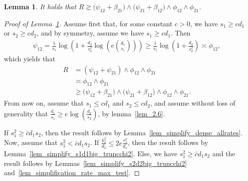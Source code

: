 \documentclass{article}
\newtheorem{lemma}{Lemma}
\theoremstyle{remark}
\begin{document}
\begin{lemma}\label{lem_simplified_rate_for_UB}
        It holds that $R \gtrsim \big(\psi_{12} + \beta_{21}\big) \land \big(\psi_{21} + \beta_{12}\big) \land \phi_{12} \land \phi_{21}$.
    \end{lemma}

    \begin{proof}[Proof of Lemma~\ref{lem_simplified_rate_for_UB}]
    Assume first that, for some constant $c>0$, we have $s_1 \geq c d_1$ or $s_2 \geq c d_2$, and by symmetry, assume we have $s_1 \geq c d_1$. 
    Then 
    \begin{align*}
        \psi_{12} = \frac{1}{s_1} \log\left(1+ \frac{d_2}{s_2^2} \log\left(e {d_1 \choose s_1}\right)\right) \geq \frac{1}{s_1} \log\left(1+ \frac{d_2}{s_2^2} \right) \asymp \phi_{12},
    \end{align*}
    which yields that
    \begin{align*}
        R &= (\psi_{12} + \psi_{21}) \land \phi_{12} \land \phi_{21}\\
        & \asymp \phi_{12} \land \phi_{21} \\
        &\geq \big(\psi_{12} + \beta_{21}\big) \land \big(\psi_{21} + \beta_{12}\big) \land \phi_{12} \land \phi_{21}.
    \end{align*}
    From now on, assume that $s_1 \leq c d_1$ and $s_2 \leq c d_2$, and assume without loss of generality that $\frac{d_1}{s_1} \geq e\log\left(\frac{d_2}{s_2}\right)$, by lemma~\ref{lem_2.6}. 

    If $s_1^2 \geq \bar c d_1 s_2$, then the result follows by Lemma~\ref{lem_simplify_dense_allrates}. Now, assume that $s_1^2 < \bar c d_1 s_2$. If $\frac{k^2_2}{d_2} \leq 2e\frac{s_1^2}{d_1}$, then the result follows by Lemma~\ref{lem_simplify_s1d1big_truncchi2}. 
    Else, we have $s_1^2 \geq \bar c d_1 s_2$ and the result follows by Lemmas~\ref{lem_simplify_s2d2big_truncchi2} and~\ref{lem_simplification_rate_max_test}.
        
    \end{proof}
\end{document}
